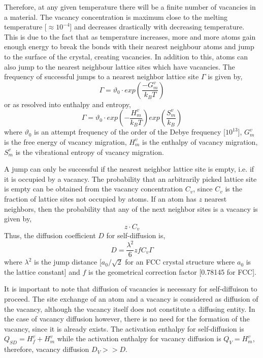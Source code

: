 \documentclass{report}
\begin{document}
Therefore, at any given temperature there will be a finite number of vacancies in a material. The vacancy concentration is maximum close to the melting temperature [$\approx10^{-4}$] and decreases drastically with decreasing temperature. This is due to the fact that as temperature increases, more and more atoms gain enough energy to break the bonds with their nearest neighbour atoms and jump to the surface of the crystal, creating vacancies. In addition to this, atoms can also jump to the nearest neighbour lattice sites which have vacancies. The frequency of successful jumps to a nearest neighbor lattice site $\Gamma$ is given by,
%
\begin{equation}
\Gamma = \vartheta_0 \cdot exp\left(\dfrac{-G^v_m}{k_B T}\right)
\end{equation}
%
or as resolved into enthalpy and entropy,
%
\begin{equation}
\Gamma = \vartheta_0 \cdot exp\left(-\dfrac{H^v_m}{k_B T}\right) exp\left(\dfrac{S^v_m}{k_B}\right)
\end{equation}
%
where $\vartheta_0$ is an attempt frequency of the order of the Debye frequency [$10^{13}$],  $G^v_m$ is the free energy of vacancy migration, $H^v_m$ is the enthalpy of vacancy migration, $S^v_m$ is the vibrational entropy of vacancy migration.

A jump can only be successful if the nearest neighbor lattice site is empty, i.e. if it is occupied by a vacancy. The probability that an arbitrarily picked lattice site is empty can be obtained from the vacancy concentration $C_v$, since $C_v$ is the fraction of lattice sites not occupied by atoms. If an atom has $z$ nearest neighbors, then the probability that any of the next neighbor sites is a vacancy is given by, 
%
\begin{equation}
z \cdot C_v
\end{equation}
%
 Thus, the diffusion coefficient $D$ for self-diffusion is,
%
\begin{equation}
D = \dfrac{\lambda^2}{6} z f C_v \Gamma
\end{equation}
%
where $\lambda^2$ is the jump distance [$a_0/\sqrt 2$ for an FCC crystal structure where $a_0$ is the lattice constant] and $f$ is the geometrical correction factor [0.78145 for FCC].

It is important to note that diffusion of vacancies is necessary for self-diffuison to proceed. The site exchange of an atom and a vacancy is considered as diffusion of the vacancy, although the vacancy itself does not constitute a diffusing entity. In the case of vacancy diffusion however, there is no need for the formation of the vacancy, since it is already exists. The activation enthalpy for self-diffusion is $Q_{SD} = H^v_f + H^v_m$ while the activation enthalpy for vacancy diffusion is $Q_{V} =  H^v_m$, therefore, vacancy diffusion $D_V>>D$.
\end{document}
